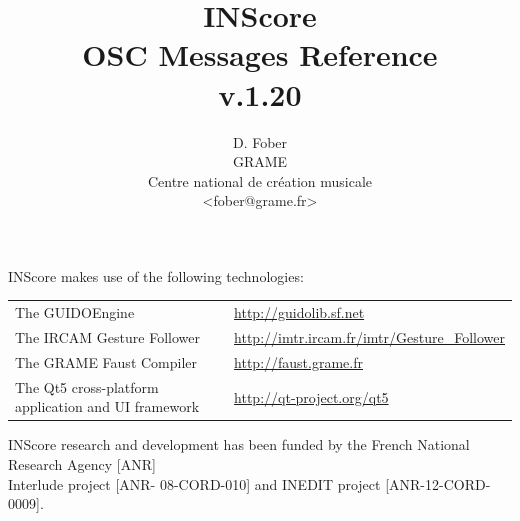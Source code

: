 \documentclass[a4paper,twoside]{report}
\begin{document}
\title{INScore \\ OSC Messages Reference \\v.1.20}

\author{D. Fober\\ GRAME\\ Centre national de cr\'eation musicale\\
{\small <fober@grame.fr>} \\
}

\maketitle

\vspace*{17.5cm}
 
{\small INScore makes use of the following technologies:}
\begin{table}[h]
\begin{tabular}{ll}
{\small The GUIDOEngine}  					& {\small \url{http://guidolib.sf.net}} \\
{\small The IRCAM Gesture Follower} 		& {\small \url{http://imtr.ircam.fr/imtr/Gesture_Follower}} \\
{\small The GRAME Faust Compiler} 		& {\small \url{http://faust.grame.fr}} \\
{\small The Qt5 cross-platform application and UI framework} & {\small \url{http://qt-project.org/qt5}}
\end{tabular}
\end{table}%

{\small INScore research and development has been funded by the French National Research Agency [ANR]\\ Interlude project [ANR- 08-CORD-010] and INEDIT project [ANR-12-CORD-0009].}
  

\pagestyle{empty}
\cleardoublepage
\tableofcontents

\vspace*{18.5cm}

\noindent\hrulefill\par
\vspace*{2mm}
\noindent{}
\thispagestyle{empty}
\pagestyle{plain}
\end{document}
